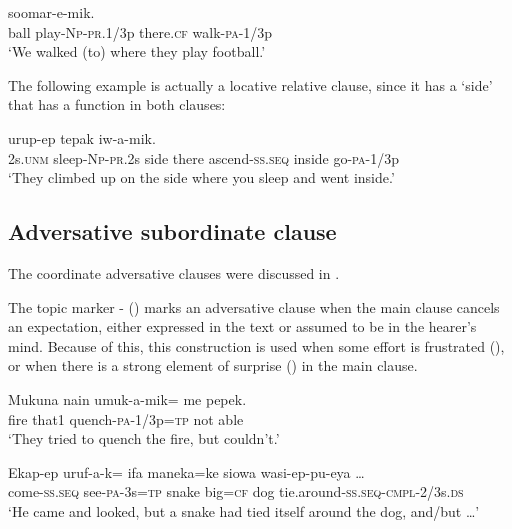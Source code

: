 \ea%
\label{ex:x1626}
  soomar-e-mik.\\
ball  play-\textsc{Np}-\textsc{pr}.1/3p there.\textsc{cf} walk-\textsc{pa}-1/3p\\
\glt`We walked (to) where they play football.'
\z


The following example is actually a locative relative clause, since it has a   `side' that has a function in both clauses:

\ea%
\label{ex:x1638}
  urup-ep  tepak  iw-a-mik. \\
2s.\textsc{unm} sleep-\textsc{Np}-\textsc{pr}.2s side there ascend-\textsc{ss}.\textsc{seq} inside go-\textsc{pa}-1/3p\\
\glt`They climbed up on the side where you sleep and went inside.'
\z


\subsection{Adversative subordinate clause} 

The coordinate adversative clauses were discussed in .

The topic marker - () marks an adversative clause when the main clause cancels an expectation, either expressed in the text or assumed to be in the hearer's mind. Because of this, this construction is used when some effort is frustrated (), or when there is a strong element of surprise () in the main clause. 

\ea%
\label{ex:x729}
\gll Mukuna  nain  umuk-a-mik=  me  pepek.\\
fire  that1 quench-\textsc{pa}-1/3p=\textsc{tp} not able\\
\glt`They tried to quench the fire, but couldn't.'
\z


\ea%
\label{ex:x730}
\gll Ekap-ep  uruf-a-k=  ifa  maneka=ke  siowa wasi-ep-pu-eya {\dots} \\
come-\textsc{ss}.\textsc{seq} see-\textsc{pa}-3s=\textsc{tp} snake  big=\textsc{cf} dog tie.around-\textsc{ss}.\textsc{seq}-\textsc{cmpl}-2/3s.\textsc{ds}\\
\glt`He came and looked, but a snake had tied itself around the dog, and/but {\dots}'
\z


